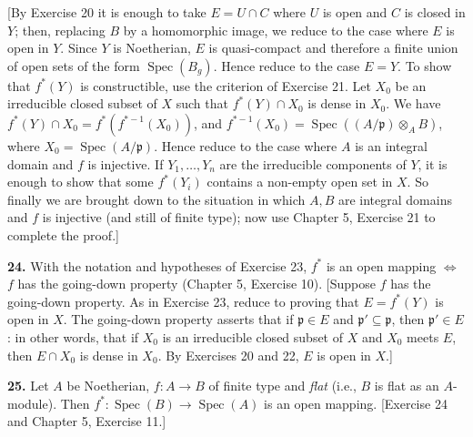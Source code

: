 [By Exercise 20 it is enough to take $E=U\cap C$ where $U$ is open and $C$ is closed
in $Y$; then, replacing $B$ by a homomorphic image, we reduce to the case where $E$
is open in $Y$.  Since $Y$ is Noetherian, $E$ is quasi-compact and therefore a finite
union of open sets of the form $\operatorname{Spec}(B_g)$.  Hence reduce to the case $E=Y$.  To
show that $f^*(Y)$ is constructible, use the criterion of Exercise 21.  Let $X_0$ be an
irreducible closed subset of $X$ such that $f^*(Y)\cap X_0$ is dense in $X_0$.  We have
$f^*(Y)\cap X_0=f^*(f^{*-1}(X_0))$, and $f^{*-1}(X_0)=\operatorname{Spec}((A/\mathfrak p)\otimes_A B)$, where $X_0=
\operatorname{Spec}(A/\mathfrak p)$.  Hence reduce to the case where $A$ is an integral domain and $f$ is injective.  If $Y_1,\ldots,Y_n$ are the irreducible components of $Y$, it is enough to show that
some $f^*(Y_i)$ contains a non-empty open set in $X$.  So finally we are brought down
to the situation in which $A,B$ are integral domains and $f$ is injective (and still
of finite type); now use Chapter 5, Exercise 21 to complete the proof.]

\medskip
\noindent\textbf{24.} With the notation and hypotheses of Exercise 23, $f^*$ is an open mapping $\Longleftrightarrow$
$f$ has the going-down property (Chapter 5, Exercise 10).  [Suppose $f$ has the
going-down property.  As in Exercise 23, reduce to proving that $E=f^*(Y)$ is
open in $X$.  The going-down property asserts that if $\mathfrak p\in E$ and $\mathfrak p'\subseteq\mathfrak p$, then
$\mathfrak p'\in E$: in other words, that if $X_0$ is an irreducible closed subset of $X$ and $X_0$
meets $E$, then $E\cap X_0$ is dense in $X_0$.  By Exercises 20 and 22, $E$ is open in $X$.]

\medskip
\noindent\textbf{25.} Let $A$ be Noetherian, $f:A\longrightarrow B$ of finite type and \emph{flat} (i.e., $B$ is flat as an $A$-module).  Then $f^*:\operatorname{Spec}(B)\longrightarrow\operatorname{Spec}(A)$ is an open mapping.  [Exercise 24 and
Chapter 5, Exercise 11.]
